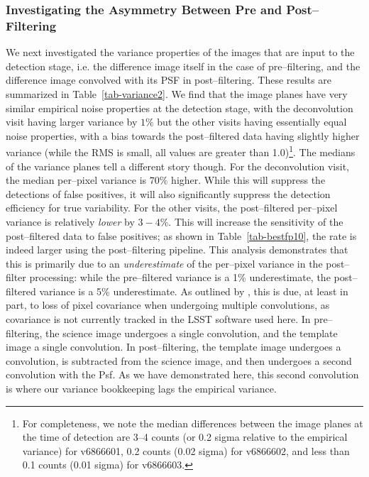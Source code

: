 \documentclass[floatfix, apj]{emulateapj}
\begin{document}
\subsubsection{Investigating the Asymmetry Between Pre and Post--Filtering}

We next investigated the variance properties of the images that are input to the detection stage, i.e. the difference image itself in the case of pre--filtering, and the difference image convolved with its PSF in post--filtering.
These results are summarized in Table~\ref{tab-variance2}.
We find that the image planes have very similar empirical noise properties at the detection stage, with the deconvolution visit having larger variance by $1\%$ but the other visits having essentially equal noise properties, with a bias towards the post--filtered data having slightly higher variance (while the RMS is small, all values are greater than 1.0)\footnote{For completeness, we note the median differences between the image planes at the time of detection are 3--4 counts (or 0.2 sigma relative to the empirical variance) for v6866601, 0.2 counts (0.02 sigma) for v6866602, and less than 0.1 counts (0.01 sigma) for v6866603.}.
The medians of the variance planes tell a different story though.
For the deconvolution visit, the median per--pixel variance is $70\%$ higher.
While this will suppress the detections of false positives, it will also significantly suppress the detection efficiency for true variability.
For the other visits, the post--filtered per--pixel variance is relatively {\it lower} by $3-4\%$.
This will increase the sensitivity of the post--filtered data to false positives; as shown in Table~\ref{tab-bestfp10}, the rate is indeed larger using the post--filtering pipeline.
This analysis demonstrates that this is primarily due to an {\it underestimate} of the per--pixel variance in the post--filter processing: while the pre--filtered variance is a 1\% underestimate, the post--filtered variance is a 5\% underestimate.
As outlined by \cite{Price-Stacking}, this is due, at least in part, to loss of pixel covariance when undergoing multiple convolutions, as covariance is not currently tracked in the LSST software used here.
In pre--filtering, the science image undergoes a single convolution, and the template image a single convolution.
In post--filtering, the template image undergoes a convolution, is subtracted from the science image, and then undergoes a second convolution with the Psf.
As we have demonstrated here, this second convolution is where our variance bookkeeping lags the empirical variance.
\end{document}
